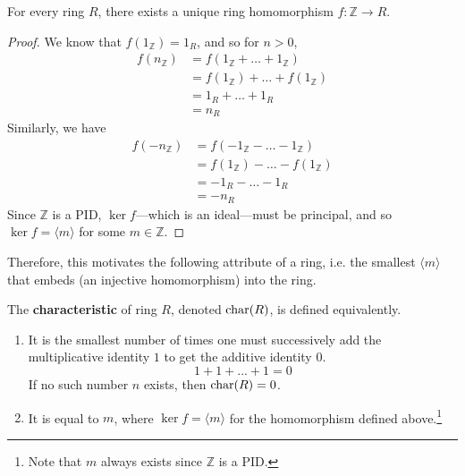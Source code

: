   \begin{theorem}
    For every ring $R$, there exists a unique ring homomorphism $f: \mathbb{Z} \to R$. 
  \end{theorem}
  \begin{proof}
    We know that $f(1_{\mathbb{Z}}) = 1_R$, and so for $n > 0$, 
    \begin{align}
      f(n_{\mathbb{Z}}) & = f(1_{\mathbb{Z}} + \ldots + 1_{\mathbb{Z}}) \\
                        & = f(1_{\mathbb{Z}}) + \ldots + f(1_{\mathbb{Z}}) \\
                        & = 1_R + \ldots + 1_R \\
                        & = n_R
    \end{align} 
    Similarly, we have 
    \begin{align}
      f(-n_{\mathbb{Z}}) & = f(-1_{\mathbb{Z}} - \ldots - 1_{\mathbb{Z}}) \\
                         & = f(1_{\mathbb{Z}}) - \ldots - f(1_{\mathbb{Z}}) \\
                         & = -1_R - \ldots - 1_R \\
                         & = -n_R
    \end{align} 
    Since $\mathbb{Z}$ is a PID, $\ker{f}$---which is an ideal---must be principal, and so $\ker{f} = \langle m \rangle$ for some $m \in \mathbb{Z}$. 
  \end{proof} 

  Therefore, this motivates the following attribute of a ring, i.e. the smallest $\langle m \rangle$ that embeds (an injective homomorphism) into the ring. 

  \begin{definition}
    The \textbf{characteristic} of ring $R$, denoted $\operatorname{char}(R)$, is defined equivalently. 
    \begin{enumerate}
      \item It is the smallest number of times one must successively add the multiplicative identity $1$ to get the additive identity $0$. 
      \begin{equation}
        1 + 1 + ... + 1 = 0 
      \end{equation}
      If no such number $n$ exists, then $\operatorname{char}(R) = 0$. 

    \item It is equal to $m$, where $\ker{f} = \langle m \rangle$ for the homomorphism defined above.\footnote{Note that $m$ always exists since $\mathbb{Z}$ is a PID.}
    \end{enumerate}
  \end{definition}

